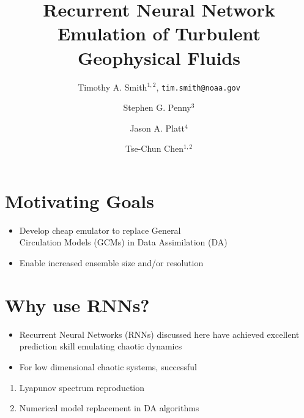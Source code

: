\title{Recurrent Neural Network Emulation of Turbulent Geophysical Fluids}

\author{Timothy A. Smith$^{1,2}$, \texttt{tim.smith@noaa.gov}\vspace{-.25em}}

\begin{minipage}{.5\textwidth}
    \vspace{-1.75em}
    \author{Stephen G. Penny$^{3}$\vspace{.25em}}
    \author{Jason A. Platt$^{4}$\vspace{.25em}}
    \author{Tse-Chun Chen$^{1,2}$}
\end{minipage}
\begin{minipage}{.5\textwidth}
\end{minipage}

\section{Motivating Goals}
\begin{itemize}
    \item Develop cheap emulator to replace General\\Circulation Models (GCMs) in Data Assimilation (DA)
    \item Enable increased ensemble size and/or resolution
\end{itemize}

\section{Why use RNNs?}
\begin{itemize}
    \item Recurrent Neural Networks (RNNs) discussed here have achieved excellent
        prediction skill emulating chaotic dynamics \cite{platt_systematic_2022}
    \item For low dimensional chaotic systems, successful
\end{itemize}

\hfill\begin{minipage}{.95\textwidth}
    \begin{enumerate}
        \item Lyapunov spectrum reproduction\cite{pathak_using_2017}
        \item Numerical model replacement in DA algorithms
            \cite{penny_integrating_2022}
    \end{enumerate}
\end{minipage}

